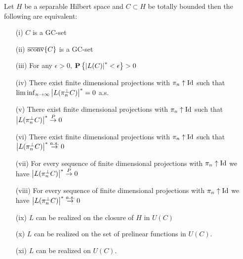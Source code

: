 \begin{thm}\label{GCSetEquivalentConditions}Let $H$ be a separable Hilbert space and $C \subset H$ be totally bounded then the following are equivalent:
\begin{itemize}
\item[(i)] $C$ is a GC-set
\item[(ii)] $\overline{\operatorname*{sconv}}\{C\}$ is a GC-set
\item[(iii)] For any $\epsilon > 0$, $\textbf{P}\left \{\left \vert L(C) \right \vert^* < \epsilon \right \} > 0$
\item[(iv)] There exist finite dimensional projections with $\pi_n \uparrow \operatorname*{Id}$ such that $\liminf_{n \to \infty} \left \vert L(\pi_n^\perp C) \right \vert^* = 0$ a.s.
\item[(v)] There exist finite dimensional projections with $\pi_n \uparrow \operatorname*{Id}$ such that $\left \vert L(\pi_n^\perp C) \right \vert^* \overset{P}\to 0$ 
\item[(vi)] There exist finite dimensional projections with $\pi_n \uparrow \operatorname*{Id}$ such that $\left \vert L(\pi_n^\perp C) \right \vert^* \overset{a.s.}\to 0$ 
\item[(vii)] For every sequence of finite dimensional projections with $\pi_n \uparrow \operatorname*{Id}$ we have $\left \vert L(\pi_n^\perp C) \right \vert^* \overset{P}\to 0$ 
\item[(viii)] For every sequence of finite dimensional projections with $\pi_n \uparrow \operatorname*{Id}$ we have $\left \vert L(\pi_n^\perp C) \right \vert^* \overset{a.s.}\to 0$ 
\item[(ix)] $L$ can be realized on the closure of $H$ in $U(C)$ 
\item[(x)] $L$ can be realized on the set of prelinear functions in $U(C)$.
\item[(xi)] $L$ can be realized on $U(C)$.
\end{itemize}
\end{thm}
